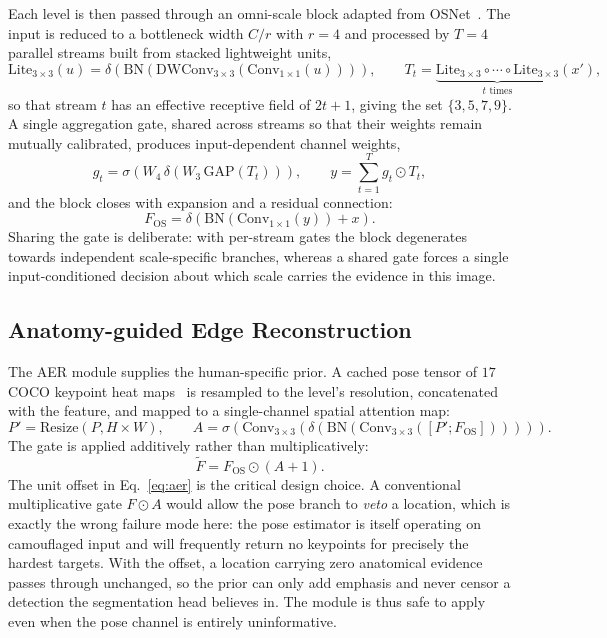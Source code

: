 \documentclass[3p,times,procedia]{elsarticle}
\newcommand{\eltmul}{\odot}
\begin{document}
Each level is then passed through an omni-scale block adapted from OSNet~\cite{osnet}. The input is reduced to a bottleneck width $C/r$ with $r=4$ and processed by $T=4$ parallel streams built from stacked lightweight units,
\begin{equation}
\mathrm{Lite}_{3\times3}(u) = \delta\!\left(\mathrm{BN}\!\left(\mathrm{DWConv}_{3\times3}
\left(\mathrm{Conv}_{1\times1}(u)\right)\right)\right),
\qquad
T_t = \underbrace{\mathrm{Lite}_{3\times3} \circ \cdots \circ \mathrm{Lite}_{3\times3}}_{t \text{ times}}(x'),
\end{equation}
so that stream $t$ has an effective receptive field of $2t+1$, giving the set $\{3,5,7,9\}$. A single aggregation gate, shared across streams so that their weights remain mutually calibrated, produces input-dependent channel weights,
\begin{equation}
g_t = \sigma\!\left(W_4\,\delta\!\left(W_3\,\mathrm{GAP}(T_t)\right)\right),
\qquad
y = \sum_{t=1}^{T} g_t \eltmul T_t ,
\end{equation}
and the block closes with expansion and a residual connection:
\begin{equation}
F_{\mathrm{OS}} = \delta\!\left(\mathrm{BN}\!\left(\mathrm{Conv}_{1\times1}(y)\right) + x\right).
\end{equation}
Sharing the gate is deliberate: with per-stream gates the block degenerates towards independent scale-specific branches, whereas a shared gate forces a single input-conditioned decision about which scale carries the evidence in this image.

\subsection{Anatomy-guided Edge Reconstruction}

The AER module supplies the human-specific prior. A cached pose tensor of $17$ COCO keypoint heat maps~\cite{coco} is resampled to the level's resolution, concatenated with the feature, and mapped to a single-channel spatial attention map:
\begin{equation}
P' = \mathrm{Resize}(P, H \times W),
\qquad
A = \sigma\!\left(\mathrm{Conv}_{3\times3}\!\left(\delta\!\left(\mathrm{BN}
\left(\mathrm{Conv}_{3\times3}\!\left([P' ; F_{\mathrm{OS}}]\right)\right)\right)\right)\right) .
\end{equation}
The gate is applied additively rather than multiplicatively:
\begin{equation}
\tilde{F} = F_{\mathrm{OS}} \eltmul (A + 1).
\label{eq:aer}
\end{equation}
The unit offset in Eq.~\eqref{eq:aer} is the critical design choice. A conventional multiplicative gate $F \eltmul A$ would allow the pose branch to \emph{veto} a location, which is exactly the wrong failure mode here: the pose estimator is itself operating on camouflaged input and will frequently return no keypoints for precisely the hardest targets. With the offset, a location carrying zero anatomical evidence passes through unchanged, so the prior can only add emphasis and never censor a detection the segmentation head believes in. The module is thus safe to apply even when the pose channel is entirely uninformative.
\end{document}
